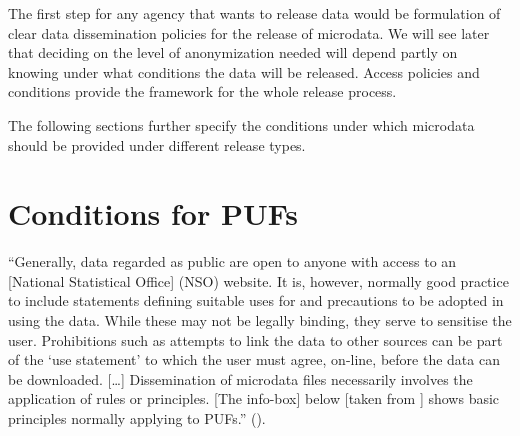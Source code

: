 \documentclass[letterpaper,10pt,english]{sphinxmanual}
\begin{document}
The first step for any agency that wants to release data would be
formulation of clear data dissemination policies for the release of
microdata. We will see later that deciding on the level of anonymization
needed will depend partly on knowing under what conditions the data will
be released. Access policies and conditions provide the framework for
the whole release process.

The following sections further specify the conditions under which
microdata should be provided under different release types.


\section{Conditions for PUFs}
\label{\detokenize{release_types:conditions-for-pufs}}
“Generally, data regarded as public are open to anyone with access to an
{[}National Statistical Office{]} (NSO) website. It is, however, normally
good practice to include statements defining suitable uses for and
precautions to be adopted in using the data. While these may not be
legally binding, they serve to sensitise the user. Prohibitions such as
attempts to link the data to other sources can be part of the ‘use
statement’ to which the user must agree, on-line, before the data can be
downloaded. {[}…{]} Dissemination of microdata files necessarily involves
the application of rules or principles. {[}The info-box{]} below {[}taken from
{\hyperref[\detokenize{release_types:dubo10}]{}}{]} shows basic principles normally applying to
PUFs.” ({\hyperref[\detokenize{release_types:dubo10}]{}}).
\end{document}
